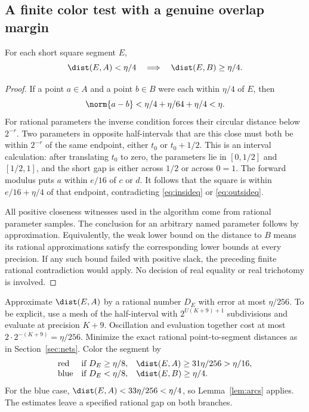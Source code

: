\subsection{A finite color test with a genuine overlap margin}

\begin{lemma}\label{lem:arcs}
For each short square segment $E$,
\[
       \dist(E,A)<\eta/4\quad\Longrightarrow\quad
       \dist(E,B)\ge\eta/4.
\]
\end{lemma}

\begin{proof}
If a point $a\in A$ and a point $b\in B$ were each within
$\eta/4$ of $E$, then
\[
                  \norm{a-b}<\eta/4+\eta/64+\eta/4<\eta.
\]
For rational parameters the inverse condition forces their circular
distance below $2^{-r}$. Two parameters in opposite half-intervals
that are this close must both be within $2^{-r}$ of the same
endpoint, either $t_0$ or $t_0+1/2$. This is an interval calculation:
after translating $t_0$ to zero, the parameters lie in
$[0,1/2]$ and $[1/2,1]$, and the short gap is either across
$1/2$ or across $0=1$.
The forward modulus puts $a$ within $e/16$ of $c$ or $d$.
It follows that the square is within $e/16+\eta/4$ of that
endpoint, contradicting \eqref{eq:insideq} or \eqref{eq:outsideq}.

All positive closeness witnesses used in the algorithm come from
rational parameter samples. The conclusion for an arbitrary named
parameter follows by approximation. Equivalently, the weak lower
bound on the distance to $B$ means its rational approximations
satisfy the corresponding lower bounds at every precision.
If any such bound failed with positive slack, the preceding
finite rational contradiction would apply. No decision of
real equality or real trichotomy is involved.
\end{proof}

Approximate $\dist(E,A)$ by a rational number $D_E$ with error
at most $\eta/256$. To be explicit, use a mesh of the half-interval
with $2^{U(K+9)+1}$ subdivisions and evaluate at precision $K+9$.
Oscillation and evaluation together cost at most
$2\cdot2^{-(K+9)}=\eta/256$. Minimize the exact rational
point-to-segment distances as in Section~\ref{sec:nets}.
Color the segment by
\begin{equation}
 \begin{array}{lll}
 \text{red}&\text{if }D_E\ge\eta/8,&
       \dist(E,A)\ge31\eta/256>\eta/16,\\
 \text{blue}&\text{if }D_E<\eta/8,&
       \dist(E,B)\ge\eta/4.
 \end{array}
 \label{eq:squarecolors}
\end{equation}
For the blue case,
$\dist(E,A)<33\eta/256<\eta/4$, so
Lemma~\ref{lem:arcs} applies. The estimates leave a specified
rational gap on both branches.


